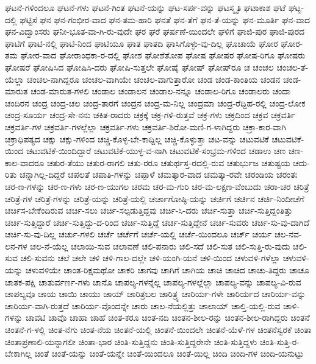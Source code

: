 ಘಟನೆ-ಗಳಿಂದಲೂ
ಘಟನೆ-ಗಳು
ಘಟನೆ-ಗಿಂತ
ಘಟನೆ-ಯನ್ನು
ಘಟ-ಸರ್ಪ-ವನ್ನು
ಘಟಸ್ಮೃತಿ
ಘಟಾಕಾಶ
ಘಟೆ
ಘಟ್ಟ-ದಲ್ಲಿ
ಘಟ್ಟಿಸೆ
ಘನ
ಘನ-ಗಂಭೀರ-ವಾದ
ಘನ-ತಮ-ಹಾರಿ
ಘನತೆ
ಘನ-ತೆಗೆ
ಘನ-ತೆ-ಯನ್ನು
ಘನ-ಮೂರ್ತಿ
ಘನ-ವಾದ
ಘನ-ವಿದ್ವಾಂಸರು
ಘನೀ-ಭೂತ-ವಾ-ಗಿ-ರು-ವುದೇ
ಘರ
ಘರೆ
ಘರ್ಷಣೆ-ಯಿಂದಲೇ
ಘಳಿಗೆ
ಘಾಜಿ-ಪುರ
ಘಾಜಿ-ಪುರದ
ಘಾಟಿಗೆ
ಘಾಟಿ-ನಲ್ಲಿ
ಘಾಟಿ-ನಿಂದ
ಘಾಟಿಯೂ
ಘಾತ
ಘಾತದಿ
ಘಾಸಿಗೊಳ್ಳು-ವು-ದಿಲ್ಲ
ಘೂಚಾಯೆ
ಘೋರ
ಘೋರ-ತಮ
ಘೋರ-ವಾದ
ಘೋರಾಂಧಕಾ-ರ-ದಲ್ಲಿ
ಘೋಶ
ಘೋಶೆತೋಪ
ಘೋಷ
ಘೋಷರ
ಘೋಷ-ರಿಗೂ
ಘೋಷರು
ಘೋಷರೆ
ಘೋಷಿಸಿದ
ಘೋಷಿಸಿ-ದರು
ಘೋಷಿ-ಸುತ್ತಲೇ
ಘೋಷೈ
ಘೋಷ್
ಘೋಷ್‌ರೂ
ಚ
ಚಂಚಲ
ಚಂಚಲ-ತೆ-ಯೆಲ್ಲಾ
ಚಂಚಲ-ನಾಗಿದ್ದರೂ
ಚಂಚಲ-ವಾಗಿಯೇ
ಚಂಚಲ-ವಾಗುತ್ತಾರೋ
ಚಂಡ
ಚಂಡ-ಕಾಂತಿಯ
ಚಂಡನ
ಚಂಡ-ಮಾರುತ
ಚಂಡ-ಮಾರುತ-ಗಳಲಿ
ಚಂಡಾಲ
ಚಂಡಾಲನ
ಚಂಡಾಲ-ನನ್ನೂ
ಚಂಡಾಲ-ರಿಗೂ
ಚಂಡಾಲರು
ಚಂದಾ
ಚಂದಿರನ
ಚಂದ್ರ
ಚಂದ್ರ-ಚಲ
ಚಂದ್ರ-ತಾರಗೆ
ಚಂದ್ರನ
ಚಂದ್ರ-ಮ-ನಿಲ್ಲ
ಚಂದ್ರಮಾ
ಚಂದ್ರ-ರೆದ್ದಿಹ-ರಲ್ಲಿ
ಚಂದ್ರ-ಲೋಕ
ಚಂದ್ರ-ಸೂರ್ಯ
ಚಂದ್ರ-ಸೇ-ನನು
ಚಕಿತ-ರಾದರು
ಚಕ್ರಕ್ಕೆ
ಚಕ್ರ-ಗಳಿ-ರುತ್ತವೆ
ಚಕ್ರ-ಗಳು
ಚಕ್ರದಿಂದ
ಚಕ್ರವ
ಚಕ್ರವರ್ತಿ
ಚಕ್ರವರ್ತಿ-ಗಳ
ಚಕ್ರವರ್ತಿ-ಗಳಲ್ಲೆಲ್ಲಾ
ಚಕ್ರವರ್ತಿ-ಗಳು
ಚಕ್ರವರ್ತಿ-ಶಿರೋ-ಮಣಿ-ಗ-ಳಾಗಿದ್ದರು
ಚಕ್ರಾ-ಕಾರ-ವಾಗಿ
ಚಕ್ರಾಧಿಪತ್ಯದ
ಚಕ್ಷು
ಚಕ್ಷು-ಗಳಿಂದ
ಚಚ್ಚಿ-ಕೊಳ್ಳ-ಬೇ-ಕಾದ್ದಿಲ್ಲ
ಚಚ್ಚಿ-ಕೊಳ್ಳುತ್ತಾ
ಚಟ-ವನ್ನು
ಚಟುವಟಿಕೆ
ಚಟುವಟಿಕೆ-ಯಿಂದ
ಚಟುವಟಿಕೆ-ಯಿಂದಿದ್ದಾರೆ
ಚಟುವಟಿಕೆ-ಯುಳ್ಳ-ವ-ನಾಗಿ
ಚಟುವಟಿಕೆ-ಸಂಭ್ರಮ-ಗಳಿಂದ
ಚಡಾಉ
ಚಣ
ಚಣ-ಕಾಲ-ವಾದರೂ
ಚತುರ-ತೆಯು
ಚತುರ-ರಾಗಲಿ
ಚತು-ರರೂ
ಚತುರ್ಥಸ್ತ-ರದಲ್ಲಿ-ರುವ
ಚತುರ್ಭುಜ
ಚತುಷ್ಟಯ
ಚದು-ರಿತು
ಚನ್ನಾಗಿಲ್ಲ-ದಿದ್ದರೆ
ಚಪಲತೆ
ಚಪಾತಿ-ಗಳನ್ನು
ಚಪ್ಪಾಳೆ
ಚಮತ್ಕಾರ-ವಾದ
ಚಮತ್ಕಾ-ರವೇ
ಚರಂಡಿಯ
ಚರಂತಃ
ಚರ-ಣ-ಗಳನ್ನು
ಚರ-ಣ-ಗಳು
ಚರ-ಣ-ಯುಗಲ
ಚರಮ
ಚರ-ಮ-ಗುರಿ
ಚರ-ಮ-ಲಕ್ಷಣ-ವೆಂಬುದು
ಚರಾ-ಚರ
ಚರಿತ್ರೆ
ಚರಿತ್ರೆ-ಗಳ
ಚರಿತ್ರೆ-ಗಳನ್ನು
ಚರಿತ್ರೆ-ಯನ್ನು
ಚರಿತ್ರೆ-ಯಲ್ಲಿ
ಚರ್ಚಾಗೋಷ್ಠಿ-ಯನ್ನು
ಚರ್ಚಿಗೆ
ಚರ್ಚಿನ
ಚರ್ಚಿ-ನಿಂದೀಚೆಗೆ
ಚರ್ಚಿಸ-ಬೇಕೆಂದಿರುವ
ಚರ್ಚಿ-ಸಲು
ಚರ್ಚಿ-ಸಲ್ಪಡುತ್ತಿದ್ದವು
ಚರ್ಚಿ-ಸಿ-ದರು
ಚರ್ಚಿ-ಸುತ್ತಾ
ಚರ್ಚಿ-ಸುತ್ತಿದ್ದಂತಿತ್ತು
ಚರ್ಚಿ-ಸುತ್ತಿದ್ದಾರೆ
ಚರ್ಚಿ-ಸುತ್ತಿದ್ದು-ದ-ರಿಂದ
ಚರ್ಚಿ-ಸುತ್ತಿದ್ದೆ
ಚರ್ಚಿ-ಸುತ್ತಿದ್ದೇನೆ
ಚರ್ಚಿ-ಸುವರು
ಚರ್ಚಿ-ಸು-ವು-ದಾಗಿದೆ
ಚರ್ಚಿ-ಸು-ವು-ದಿಲ್ಲ
ಚರ್ಚು-ಗಳಲಿ
ಚರ್ಚೆ
ಚರ್ಚೆಗೆ
ಚರ್ಚೆ-ಯಲ್ಲಿ
ಚರ್ಚೆ-ಯಿಂದಲೂ
ಚರ್ಚ್
ಚರ್ಯ
ಚಲ-ನವ-ಲನ-ಗಳ
ಚಲ-ನೆ-ಯೆಲ್ಲ
ಚಲಾಯಿ-ಸುವ
ಚಲಾವಣೆ
ಚಲಿ-ಪನಾರು
ಚಲಿ-ಸದೆ
ಚಲಿ-ಸುತ
ಚಲಿ-ಸುತ್ತಿ-ರು-ವುದು
ಚಲಿ-ಸುವ
ಚಲಿ-ಸುವನು
ಚಲೆ
ಚಲೇ
ಚಳಿ
ಚಳಿ-ಗಾಲ-ದಲ್ಲೇ
ಚಳಿ-ಯಂಗಿ-ಯನೆ
ಚಳಿ-ಯಿಂದ
ಚಳುವಳಿ-ಗಳೆಲ್ಲಾ
ಚಳುವಳಿ-ಯನ್ನು
ಚಳುವಳಿಯೇ
ಚಾಂತ-ರಿಕ್ಷಮಥೋ
ಚಾಕರಿ
ಚಾಗವು
ಚಾಗಿಗೆ
ಚಾಗಿಯ
ಚಾಚಿ
ಚಾಚಿದ
ಚಾಚು-ತಿದ್ದರು
ಚಾಚೂ
ಚಾತಕ-ಪಕ್ಷಿ
ಚಾತುರ್ವರ್ಣ-ಗಳು
ಚಾನೊ
ಚಾಪಲ್ಯ-ಗಳನ್ನೆಲ್ಲ
ಚಾಪಲ್ಯ-ಗಳಲ್ಲೆಲ್ಲಾ
ಚಾಪಲ್ಯ-ವನ್ನು
ಚಾಪಲ್ಯ-ವಿ-ರುವ
ಚಾಪಲ್ಯವೂ
ಚಾಯ
ಚಾಯಿ
ಚಾಯು
ಚಾಯ್
ಚಾರಿತ್ರಬಲ
ಚಾರಿತ್ರ್ಯ
ಚಾರಿರ್ಯ-ಗಳೇ
ಚಾರಿರ್ಯದ
ಚಾರಿರ್ಯ-ವನ್ನು
ಚಾರಿರ್ಯ-ವಾಗಿ-ರುತ್ತದೆ
ಚಾರಿರ್ಯ-ವೊಂದನ್ನೇ
ಚಾರು
ಚಾಲ-ನೆಯಲ್ಲಿತ್ತು
ಚಾಲಾಯ್
ಚಾಲ್ತಿ-ಯಲ್ಲಿ-ರುವ
ಚಾಳಿ-ಗಳನ್ನು
ಚಾವಟಿ
ಚಾವೊ
ಚಾಹಾ
ಚಾಹೆ
ಚಿಂತ-ಕರೂ
ಚಿಂತ-ನದಿ
ಚಿಂತನ-ಶೀಲ-ರನ್ನು
ಚಿಂತನ-ಶೀಲ-ರಾಗಿದ್ದರು
ಚಿಂತನೆ
ಚಿಂತನೆ-ಗ-ಳಲ್ಲಿ
ಚಿಂತ-ನೆಗು
ಚಿಂತ-ನೆಯ
ಚಿಂತನೆ-ಯಲ್ಲಿ
ಚಿಂತನೆ-ಯಿಂದಲೇ
ಚಿಂತನೆ-ಯೆಳೆ-ಗಳ
ಚಿಂತನೆಸ್ವರಕೆ
ಚಿಂತಾ
ಚಿಂತಾಪ್ರಣಾಲಿ-ಯನ್ನಾಗಲೀ
ಚಿಂತಾ-ಭಾರ
ಚಿಂತಿ-ಸುತ್ತಿದ್ದನು
ಚಿಂತಿ-ಸುತ್ತಿದ್ದರೇನೇ
ಚಿಂತಿ-ಸುತ್ತಿದ್ದಳು
ಚಿಂತಿ-ಸುತ್ತಿ-ರ-ಬೇಕಾಗಿಲ್ಲ
ಚಿಂತೆ
ಚಿಂತೆ-ಯನ್ನು
ಚಿಂತೆ-ಯನ್ನೇ
ಚಿಂತೆ-ಯಿಂದಲೂ
ಚಿಂತೆ-ಯಿಲ್ಲ
ಚಿಂದಿ
ಚಿಂದಿ-ಗಳ
ಚಿಂದಿ-ಯನುಟ್ಟು
